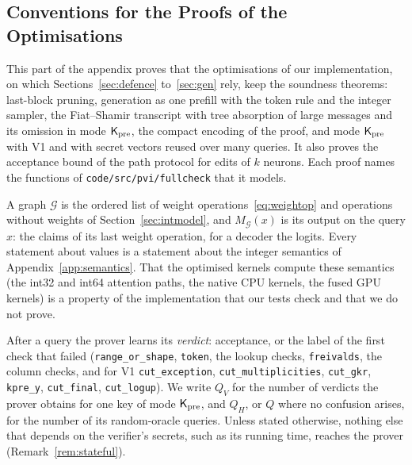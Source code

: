 \subsection{Conventions for the Proofs of the Optimisations}
\label{app:the-conv}

This part of the appendix proves that the optimisations of our implementation, on which
Sections~\ref{sec:defence} to~\ref{sec:gen} rely, keep the soundness theorems: last-block pruning,
generation as one prefill with the token rule and the integer sampler, the Fiat--Shamir transcript
with tree absorption of large messages and its omission in mode $\mathsf{K}_{\mathrm{pre}}$, the compact encoding of the
proof, and mode $\mathsf{K}_{\mathrm{pre}}$ with V1 and with secret vectors reused over many queries. It also proves the
acceptance bound of the path protocol for edits of $k$ neurons. Each proof names the functions of
\texttt{code/src/pvi/fullcheck} that it models.

 A graph $\mathcal G$ is the ordered list of weight operations~\eqref{eq:weightop} and
operations without weights of Section~\ref{sec:intmodel}, and $M_{\mathcal G}(x)$ is its output on
the query $x$: the claims of its last weight operation, for a decoder the logits. Every statement
about values is a statement about the integer semantics of Appendix~\ref{app:semantics}. That the
optimised kernels compute these semantics (the int32 and int64 attention paths, the native CPU
kernels, the fused GPU kernels) is a property of the implementation that our tests check and that
we do not prove.

 After a query the prover learns its \emph{verdict}: acceptance,
or the label of the first check that failed (\texttt{range\_or\_shape}, \texttt{token}, the lookup
checks, \texttt{freivalds}, the column checks, and for V1 \texttt{cut\_exception},
\texttt{cut\_multiplicities}, \texttt{cut\_gkr}, \texttt{kpre\_y}, \texttt{cut\_final},
\texttt{cut\_logup}). We write $Q_V$ for the number of verdicts the prover obtains for one key of
mode $\mathsf{K}_{\mathrm{pre}}$, and $Q_H$, or $Q$ where no confusion arises, for the number of its random-oracle
queries. Unless stated otherwise, nothing else that depends on the verifier's secrets, such as its
running time, reaches the prover (Remark~\ref{rem:stateful}).

